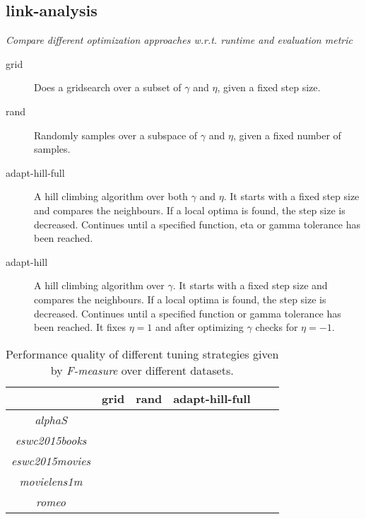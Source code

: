 
\subsection{link-analysis}

\textit{Compare different optimization approaches w.r.t. runtime and evaluation metric}

\begin{description}
    \item[grid]
        Does a gridsearch over a subset of $\gamma$ and $\eta$, given a fixed step size.
    \item[rand]
        Randomly samples over a subspace of $\gamma$ and $\eta$, given a fixed number of samples.
    \item[adapt-hill-full]
        A hill climbing algorithm over both $\gamma$ and $\eta$. It starts with a fixed step size and compares the neighbours. If a local optima is found, the step size is decreased. Continues until a specified function, eta or gamma tolerance has been reached.
    \item[adapt-hill]
        A hill climbing algorithm over $\gamma$. It starts with a fixed step size and compares the neighbours. If a local optima is found, the step size is decreased. Continues until a specified function or gamma tolerance has been reached. It fixes $\eta = 1$ and after optimizing $\gamma$ checks for $\eta = -1$.
\end{description}

\begin{table}[h!]
    \centering
    \begin{tabular}{| c | c | c | c | c | c | }
        \hline
        \textbf{}               & \textbf{grid} & \textbf{rand} & \textbf{adapt-hill-full} \\ \hline


        \textit{alphaS}         &               &               &               \\ \hline
        \textit{eswc2015books}  &               &               &               \\ \hline
        \textit{eswc2015movies} &               &               &               \\ \hline
        \textit{movielens1m}    &               &               &               \\ \hline
        \textit{romeo}          &               &               &               \\ \hline


    \end{tabular}
    \caption{Performance quality of different tuning strategies given by \textit{F-measure} over different datasets.}
    \label{tab:linkanalysis_tuning_F1}
\end{table}

